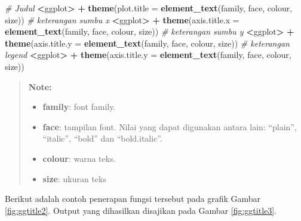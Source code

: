 \documentclass[]{book}
\newenvironment{Shaded}{\begin{snugshade}}{\end{snugshade}}
\newcommand{\KeywordTok}[1]{\textcolor[rgb]{0.13,0.29,0.53}{\textbf{#1}}}
\newcommand{\DataTypeTok}[1]{\textcolor[rgb]{0.13,0.29,0.53}{#1}}
\newcommand{\StringTok}[1]{\textcolor[rgb]{0.31,0.60,0.02}{#1}}
\newcommand{\CommentTok}[1]{\textcolor[rgb]{0.56,0.35,0.01}{\textit{#1}}}
\newcommand{\OperatorTok}[1]{\textcolor[rgb]{0.81,0.36,0.00}{\textbf{#1}}}
\newcommand{\NormalTok}[1]{#1}
\providecommand{\tightlist}{%
  \setlength{\itemsep}{0pt}\setlength{\parskip}{0pt}}
\begin{document}
\begin{Shaded}
\begin{Highlighting}[]
\CommentTok{# Judul}
\OperatorTok{<}\NormalTok{ggplot}\OperatorTok{>}\StringTok{ }\OperatorTok{+}\StringTok{ }\KeywordTok{theme}\NormalTok{(}\DataTypeTok{plot.title =} \KeywordTok{element_text}\NormalTok{(family, face, colour, size))}
\CommentTok{# keterangan sumbu x}
\OperatorTok{<}\NormalTok{ggplot}\OperatorTok{>}\StringTok{ }\OperatorTok{+}\StringTok{ }\KeywordTok{theme}\NormalTok{(}\DataTypeTok{axis.title.x =} \KeywordTok{element_text}\NormalTok{(family, face, colour, size))}
\CommentTok{# keterangan sumbu y}
\OperatorTok{<}\NormalTok{ggplot}\OperatorTok{>}\StringTok{ }\OperatorTok{+}\StringTok{ }\KeywordTok{theme}\NormalTok{(}\DataTypeTok{axis.title.y =} \KeywordTok{element_text}\NormalTok{(family, face, colour, size))}
\CommentTok{# keterangan legend}
\OperatorTok{<}\NormalTok{ggplot}\OperatorTok{>}\StringTok{ }\OperatorTok{+}\StringTok{ }\KeywordTok{theme}\NormalTok{(}\DataTypeTok{axis.title.y =} \KeywordTok{element_text}\NormalTok{(family, face, colour, size))}
\end{Highlighting}
\end{Shaded}

\begin{quote}
\textbf{Note: }

\begin{itemize}
\tightlist
\item
  \textbf{family}: font family.
\item
  \textbf{face}: tampilan font. Nilai yang dapat digunakan antara lain:
  ``plain'', ``italic'', ``bold'' dan ``bold.italic''.
\item
  \textbf{colour}: warna teks.
\item
  \textbf{size}: ukuran teks
\end{itemize}
\end{quote}

Berikut adalah contoh penerapan fungsi tersebut pada grafik Gambar
\ref{fig:ggtitle2}. Output yang dihasilkan disajikan pada Gambar
\ref{fig:ggtitle3}.
\end{document}
